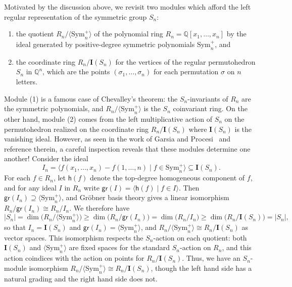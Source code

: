 \documentclass[submission]{FPSAC2024}
\theoremstyle{definition}
\theoremstyle{remark}
\numberwithin{equation}{section}
\newcommand{\QQ}{\mathbb{Q}}
\newcommand{\Sym}{\mathrm{Sym}}
\begin{document}
Motivated by the discussion above, we revisit two modules which afford the left regular representation of the symmetric group $S_{n}$:
\begin{enumerate}[itemsep = -.5ex, label = (\arabic*)]
\item the quotient $R_{n}\big/\langle \Sym_{n}^{+} \rangle$ of the polynomial ring $R_{n} = \QQ[x_{1}, \ldots, x_{n}]$ by the ideal generated by positive-degree symmetric polynomials $\Sym_{n}^{+}$, and

\item the coordinate ring $R_{n} \big/ \mathbf{I}(S_{n})$ for the vertices of the regular permutohedron $S_{n}$ in $\QQ^{n}$, which are the points $(\sigma_{1}, \ldots, \sigma_{n})$ for each permutation $\sigma$ on $n$ letters.

\end{enumerate}
Module (1) is a famous case of Chevalley's theorem: the $S_{n}$-invariants of $R_{n}$ are the symmetric polynomials, and $R_{n}\big/\langle \Sym_{n}^{+} \rangle$ is the $S_{n}$ coinvariant ring.  
On the other hand, module (2) comes from the left multiplicative action of $S_{n}$ on the permutohedron realized on the coordinate ring $R_{n} \big/ \mathbf{I}(S_{n})$  where $\mathbf{I}(S_{n})$ is the vanishing ideal. 
However, as seen in the work of Garsia and Procesi~\cite{GP} and reference therein, a careful inspection reveals that these modules determine one another!  
Consider the ideal
\[
I_{n} = \langle f(x_{1}, \ldots, x_{n}) - f(1, \ldots, n) \;|\; f \in \Sym_{n}^{+} \rangle \subseteq \mathbf{I}(S_{n}).
\]
For each $f \in R_{n}$, let $\mathsf{h}(f)$ denote the top-degree homogeneous component of $f$, and for any ideal $I$ in $R_{n}$ write $\mathsf{gr}(I) = \langle \mathsf{h}(f) \;|\; f \in I \rangle$.  
Then $\mathsf{gr}(I_{n}) \supseteq \langle \Sym_{n}^{+} \rangle$, and Gr\"{o}bner basis theory gives a linear isomorphism $R_{n}\big/\mathsf{gr}(I_{n})  \cong R_{n}\big/I_{n}$.  We therefore have
\[
|S_{n}| = \dim\big(R_{n}\big/\langle \Sym_{n}^{+} \rangle\big) \ge \dim\big(R_{n}\big/\mathsf{gr}(I_{n})\big) = \dim\big(R_{n}\big/I_{n}) \ge \dim(R_{n}\big/\mathbf{I}(S_{n})\big) = |S_{n}|,
\]
so that $I_{n} = \mathbf{I}(S_{n})$ and $\mathsf{gr}(I_{n}) = \langle \Sym_{n}^{+} \rangle$, and $R_{n}\big/\langle \Sym_{n}^{+} \rangle \cong R_{n}\big/\mathbf{I}(S_{n})$ as vector spaces.  
This isomorphism respects the $S_{n}$-action on each quotient: both $\mathbf{I}(S_{n})$ and $\langle \Sym_{n}^{+} \rangle$ are fixed spaces for the standard $S_{n}$-action on $R_{n}$, and this action coindices with the action on points for $R_{n}\big/\mathbf{I}(S_{n})$.  
Thus, we have an $S_{n}$-module isomorphism $R_{n}\big/\langle \Sym_{n}^{+} \rangle \cong R_{n}\big/\mathbf{I}(S_{n})$, though the left hand side has a natural grading and the right hand side does not.
\end{document}
